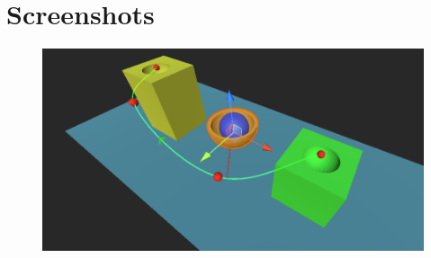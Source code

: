 \documentclass{article}
\begin{document}
    \newpage
    \section*{Screenshots}
    \begin{figure}[h!]
            \begin{center}
                \includegraphics[width=\textwidth]{scene.png}
            \end{center}
    \end{figure}

    
\end{document}
